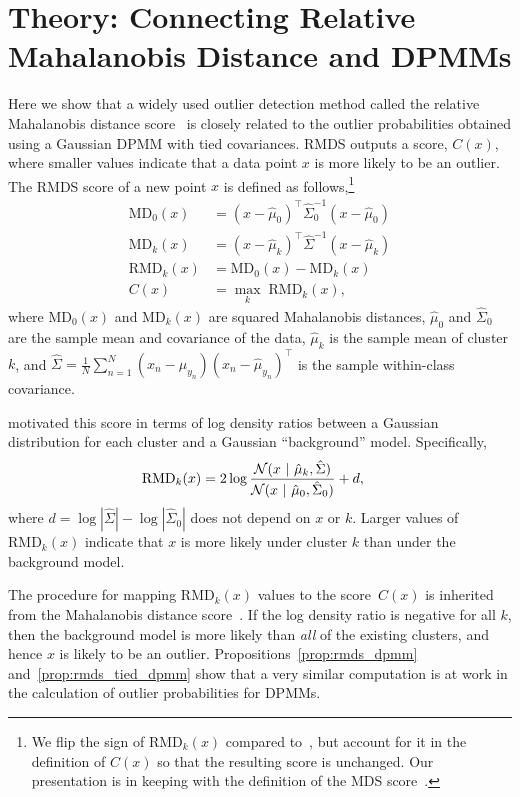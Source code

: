 \section{Theory: Connecting Relative Mahalanobis Distance and DPMMs}
\label{sec:theory}
Here we show that a widely used outlier detection method called the relative Mahalanobis distance score~\citep[RMDS;][]{ren21rmds} is closely related to the outlier probabilities obtained using a Gaussian DPMM with tied covariances. RMDS outputs a score, $C(x)$, where smaller values indicate that a data point $x$ is more likely to be an outlier.
The RMDS score of a new point $x$ is defined as follows,\footnote{We flip the sign of $\mathrm{RMD}_k(x)$ compared to~\citet{ren21rmds}, but account for it in the definition of $C(x)$ so that the resulting score is unchanged. Our presentation is in keeping with the definition of the MDS score~\citep{lee18mds}.}
\begin{align}
    \nonumber
    \mathrm{MD}_0(x) &= (x - \hat{\mu}_0)^\top \hat{\Sigma}_0^{-1} (x - \hat{\mu}_0) \\
    \nonumber
    \mathrm{MD}_k(x) &= (x - \hat{\mu}_k)^\top \hat{\Sigma}^{-1} (x - \hat{\mu}_k) \\
    \nonumber
    \mathrm{RMD}_k(x) &= \mathrm{MD}_0(x) - \mathrm{MD}_k(x)\\
    C(x) &= \max_k \; \mathrm{RMD}_k(x),
\end{align}
where $\mathrm{MD}_0(x)$ and $\mathrm{MD}_k(x)$ are squared Mahalanobis distances, $\hat{\mu}_0$ and $\hat{\Sigma}_0$ are the sample mean and covariance of the data, $\hat{\mu}_k$ is the sample mean of cluster $k$, and $\hat{\Sigma} = \tfrac{1}{N} \sum_{n=1}^N (x_n - \hat{\mu}_{y_n})(x_n - \hat{\mu}_{y_n})^\top$ is the sample within-class covariance.

\citet{ren21rmds} motivated this score in terms of log density ratios between a Gaussian distribution for each cluster and a Gaussian ``background'' model.
Specifically,
\begin{align}
    \label{eq:rmdk}
    \mathrm{RMD}_k(x) &= 2 \log \frac{\mathcal{N}(x ~\vert~ \hat{\mu}_k, \hat{\Sigma})}{\mathcal{N}(x ~\vert~ \hat{\mu}_0, \hat{\Sigma}_0)} + d,
\end{align}
where $d=\log |\hat{\Sigma}| - \log|\hat{\Sigma}_0|$ does not depend on $x$ or $k$.
Larger values of $\mathrm{RMD}_k(x)$ indicate that $x$ is more likely under cluster $k$ than under the background model.

The procedure for mapping $\mathrm{RMD}_k(x)$ values to the score~$C(x)$ is inherited from the Mahalanobis distance score~\citep[MDS;][]{lee18mds}. If the log density ratio is negative for all $k$, then the background model is more likely than \textit{all} of the existing clusters, and hence $x$ is likely to be an outlier.
Propositions~\ref{prop:rmds_dpmm} and~\ref{prop:rmds_tied_dpmm} show that a very similar computation is at work in the calculation of outlier probabilities for DPMMs.

